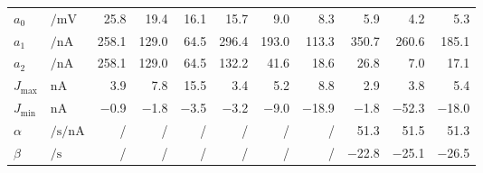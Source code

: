 \begin{table}[p]
\begin{tabular}{l l   r r r   r r r   r r r}
		$a_0$ & $\si{\per\milli\volt}$ &
		\num{25.8} & \num{19.4} & \num{16.1} &
		\num{15.7} & \num{9.0} & \num{8.3} &
		\num{5.9} & \num{4.2} & \num{5.3} \\

		$a_1$ & $\si{\per\nano\ampere}$ &
		\num{258.1} & \num{129.0} & \num{64.5} &
		\num{296.4} & \num{193.0} & \num{113.3} &
		\num{350.7} & \num{260.6} & \num{185.1} \\

		$a_2$ & $\si{\per\nano\ampere}$ &
		\num{258.1} & \num{129.0} & \num{64.5} &
		\num{132.2} & \num{41.6} & \num{18.6} &
		\num{26.8} & \num{7.0} & \num{17.1} \\[2.5mm]

	
		$J_\mathrm{max}$ & $\si{\nano\ampere}$ &
		\num{3.9} & \num{7.8} & \num{15.5} &
		\num{3.4} & \num{5.2} & \num{8.8} &
		\num{2.9} & \num{3.8} & \num{5.4} \\

		$J_\mathrm{min}$ & $\si{\nano\ampere}$ &
		\num{-0.9} & \num{-1.8} & \num{-3.5} &
		\num{-3.2} & \num{-9.0} & \num{-18.9} &
		\num{-1.8} &\num{-52.3} & \num{-18.0} \\[2.5mm]

		$\alpha$ & $\si{\per\second\per\nano\ampere}$ &
		/&/&/&/&/&/&
		\num{51.3} & \num{51.5} & \num{51.3}
		\\
		$\beta$ & $\si{\per\second}$ &
		/&/&/&/&/&/&
		\num{-22.8} & \num{-25.1} & \num{-26.5}\\
		\bottomrule
	\end{tabular}
	\label{tbl:two_comp_model_parameters}
\end{table}
